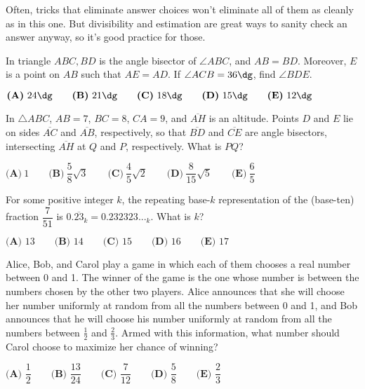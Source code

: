 \documentclass[11pt,paper=letter]{scrartcl}
\begin{document}
Often, tricks that eliminate answer choices won't eliminate all of them as cleanly as in this one. But divisibility and estimation are great ways to sanity check an answer anyway, so it's good practice for those.

\begin{mdframed}[style=exmdbox]

\begin{problem}
  In triangle $ABC, BD$ is the angle bisector of $\angle ABC$, and $AB = BD$. Moreover, $E$ is a point on $AB$ such that $AE = AD$. If $\angle ACB = 36\dg$, find $\angle BDE$.

\vspace{6pt} \noindent $\textbf{(A)}\ 24\dg \qquad
\textbf{(B)}\ 21\dg \qquad
\textbf{(C)}\ 18\dg \qquad
\textbf{(D)}\ 15\dg \qquad
\textbf{(E)}\ 12\dg$
\end{problem}

\begin{problem}[AMC 12B 2016/17]
  In $\triangle ABC$, $AB=7$, $BC=8$, $CA=9$, and $\overline{AH}$ is an altitude. Points $D$ and $E$ lie on sides $\overline{AC}$ and $\overline{AB}$, respectively, so that $\overline{BD}$ and $\overline{CE}$ are angle bisectors, intersecting $\overline{AH}$ at $Q$ and $P$, respectively. What is $PQ$?

\vspace{6pt} \noindent $\textbf{(A)}\ 1 \qquad
\textbf{(B)}\ \dfrac{5}{8}\sqrt{3} \qquad
\textbf{(C)}\ \dfrac{4}{5}\sqrt{2} \qquad
\textbf{(D)}\ \dfrac{8}{15}\sqrt{5} \qquad
\textbf{(E)}\ \dfrac{6}{5}$

\end{problem}

\begin{problem}[AMC 10A 2019/18]
  For some positive integer $k$, the repeating base-$k$ representation of the (base-ten) fraction $\dfrac{7}{51}$ is $0.\overline{23}_k = 0.232323..._k$. What is $k$?

  \vspace{6pt} \noindent $\textbf{(A) } 13 \qquad\textbf{(B) } 14 \qquad\textbf{(C) } 15 \qquad\textbf{(D) } 16 \qquad\textbf{(E) } 17$
\end{problem}

\begin{problem}[AMC 12A 2018/24]
  Alice, Bob, and Carol play a game in which each of them chooses a real number between 0 and 1. The winner of the game is the one whose number is between the numbers chosen by the other two players. Alice announces that she will choose her number uniformly at random from all the numbers between 0 and 1, and Bob announces that he will choose his number uniformly at random from all the numbers between $\frac{1}{2}$ and $\frac{2}{3}.$ Armed with this information, what number should Carol choose to maximize her chance of winning?

  \vspace{6pt} \noindent $
  \textbf{(A) }\dfrac{1}{2}\qquad
  \textbf{(B) }\dfrac{13}{24} \qquad
  \textbf{(C) }\dfrac{7}{12} \qquad
  \textbf{(D) }\dfrac{5}{8} \qquad
  \textbf{(E) }\dfrac{2}{3}\qquad
  $
\end{problem}

\end{mdframed}
\end{document}
